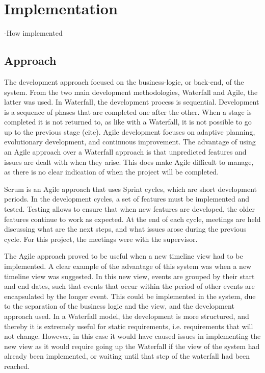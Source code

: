 \chapter{Implementation}
-How implemented
\section{Approach}
\par The development approach focused on the business-logic, or back-end, of the system. From the two main development methodologies, Waterfall and Agile, the latter was used. In Waterfall, the development process is sequential. Development is a sequence of phases that are completed one after the other. When a stage is completed it is not returned to, as like with a Waterfall, it is not possible to go up to the previous stage (cite). Agile development focuses on adaptive planning, evolutionary development, and continuous improvement. The advantage of using an Agile approach over a Waterfall approach is that unpredicted features and issues are dealt with when they arise. This does make Agile difficult to manage, as there is no clear indication of when the project will be completed.
 
\par Scrum is an Agile approach that uses Sprint cycles, which are short development periods. In the development cycles, a set of features must be implemented and tested. Testing allows to ensure that when new features are developed, the older features continue to work as expected. At the end of each cycle, meetings are held discussing what are the next steps, and what issues arose during the previous cycle. For this project, the meetings were with the supervisor.
 
\par The Agile approach proved to be useful when a new timeline view had to be implemented. A clear example of the advantage of this system was when a new timeline view was suggested. In this new view, events are grouped by their start and end dates, such that events that occur within the period of other events are encapsulated by the longer event. This could be implemented in the system, due to the separation of the business logic and the view, and the development approach used. In a Waterfall model, the development is more structured, and thereby it is extremely useful for static requirements, i.e. requirements that will not change. However, in this case it would have caused issues in implementing the new view as it would require going up the Waterfall if the view of the system had already been implemented, or waiting until that step of the waterfall had been reached.

